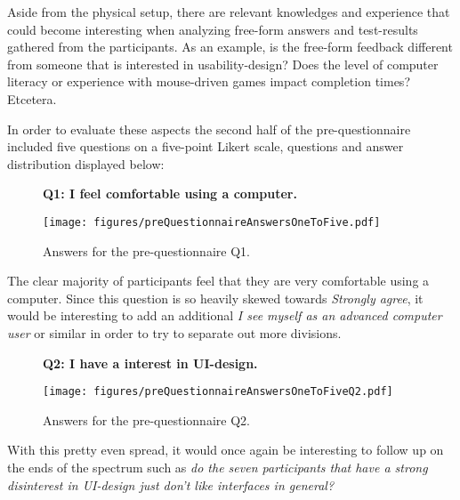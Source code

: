     Aside from the physical setup, there are relevant knowledges and
    experience that could become interesting when analyzing free-form
    answers and test-results gathered from the participants. As an example,
    is the free-form feedback different from someone that is interested in
    usability-design? Does the level of computer literacy or experience
    with mouse-driven games impact completion times? Etcetera.

    In order to evaluate these aspects the second half of the
    pre-questionnaire included five questions on a five-point Likert scale,
    questions and answer distribution displayed below:

    \begin{figure}[h!]
      \textbf{Q1: I feel comfortable using a computer.}
      \begin{center}
        \texttt{[image: figures/preQuestionnaireAnswersOneToFive.pdf]}
        \caption{Answers for the pre-questionnaire Q1.}
      \end{center}
    \end{figure}

    The clear majority of participants feel that they are very comfortable
    using a computer. Since this question is so heavily skewed towards
    \textit{Strongly agree}, it would be interesting to add an additional
    \textit{I see myself as an advanced computer user} or similar in order
    to try to separate out more divisions.

    \begin{figure}[h!]
      \textbf{Q2: I have a interest in UI-design.}
      \begin{center}
        \texttt{[image: figures/preQuestionnaireAnswersOneToFiveQ2.pdf]}
        \caption{Answers for the pre-questionnaire Q2.}
      \end{center}
    \end{figure}

    With this pretty even spread, it would once again be interesting to follow
    up on the ends of the spectrum such as \textit{do the seven participants that
    have a strong disinterest in UI-design just don't like interfaces in
    general?}
%

